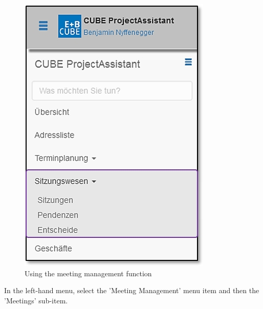\begin{figure}   %
  \vspace{-35pt}      %
  \begin{center}
    \includegraphics[width=1\linewidth]{../chapters/05_Sitzungswesen/pictures/5-1_Menu_Sitzungswesen.jpg}
  \end{center}
  \vspace{-20pt}
  \caption{Using the meeting management function}
  \vspace{-10pt}
\end{figure}

In the left-hand menu, select the 'Meeting Management' menu item and then the 'Meetings' sub-item.

